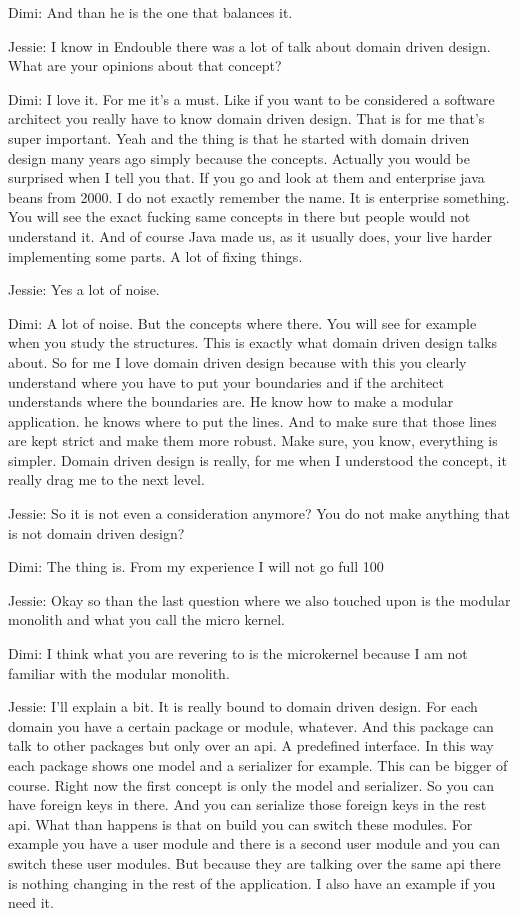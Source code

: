 Dimi: And than he is the one that balances it.

Jessie: I know in Endouble there was a lot of talk about domain driven design. What are your opinions about that concept?

Dimi: I love it. For me it's a must. Like if you want to be considered a software architect you really have to know domain driven design. That is for me that's super important. Yeah and the thing is that he started with domain driven design many years ago simply because the concepts. Actually you would be surprised when I tell you that. If you go and look at them and enterprise java beans from 2000. I do not exactly remember the name. It is enterprise something. You will see the exact fucking same concepts in there but people would not understand it. And of course Java made us, as it usually does, your live harder implementing some parts. A lot of fixing things.

Jessie: Yes a lot of noise.

Dimi: A lot of noise. But the concepts where there. You will see for example when you study the structures. This is exactly what domain driven design talks about. So for me I love domain driven design because with this you clearly understand where you have to put your boundaries and if the architect understands where the boundaries are. He know how to make a modular application. he knows where to put the lines. And to make sure that those lines are kept strict and make them more robust. Make sure, you know, everything is simpler. Domain driven design is really, for me when I understood the concept, it really drag me to the next level.

Jessie: So it is not even a consideration anymore? You do not make anything that is not domain driven design?

Dimi: The thing is. From my experience I will not go full 100%

Jessie: Okay so than the last question where we also touched upon is the modular monolith and what you call the micro kernel.

Dimi: I think what you are revering to is the microkernel because I am not familiar with the modular monolith.

Jessie: I'll explain a bit. It is really bound to domain driven design. For each domain you have a certain package or module, whatever. And this package can talk to other packages but only over an api. A predefined interface. In this way each package shows one model and a serializer for example. This can be bigger of course. Right now the first concept is only the model and serializer. So you can have foreign keys in there. And you can serialize those foreign keys in the rest api. What than happens is that on build you can switch these modules. For example you have a user module and there is a second user module and you can switch these user modules. But because they are talking over the same api there is nothing changing in the rest of the application. I also have an example if you need it.

